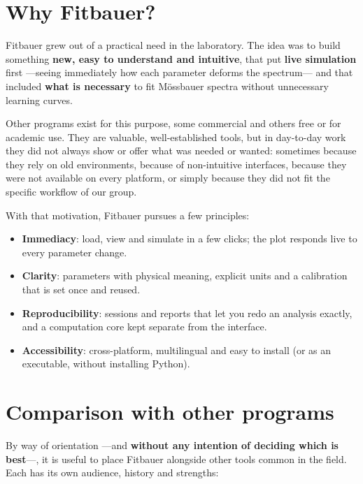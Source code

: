 \section{Why Fitbauer?}
\label{sec:porque}

Fitbauer grew out of a practical need in the laboratory. The idea was to build
something \textbf{new, easy to understand and intuitive}, that put \textbf{live
simulation} first —seeing immediately how each parameter deforms the
spectrum— and that included \textbf{what is necessary} to fit Mössbauer spectra
without unnecessary learning curves.

Other programs exist for this purpose, some commercial and others free or for
academic use. They are valuable, well-established tools, but in day-to-day
work they did not always show or offer what was needed or wanted: sometimes
because they rely on old environments, because of non-intuitive interfaces, because they were not
available on every platform, or simply because they did not fit the specific
workflow of our group.

With that motivation, Fitbauer pursues a few principles:

\begin{itemize}[nosep]
  \item \textbf{Immediacy}: load, view and simulate in a few clicks; the plot
        responds live to every parameter change.
  \item \textbf{Clarity}: parameters with physical meaning, explicit units
        and a calibration that is set once and reused.
  \item \textbf{Reproducibility}: sessions and reports that let you redo an
        analysis exactly, and a computation core kept separate from the interface.
  \item \textbf{Accessibility}: cross-platform, multilingual and easy to
        install (or as an executable, without installing Python).
\end{itemize}

\section{Comparison with other programs}
\label{sec:comparacion}

By way of orientation —and \textbf{without any intention of deciding which is best}—, it is
useful to place Fitbauer alongside other tools common in the field. Each has
its own audience, history and strengths:

